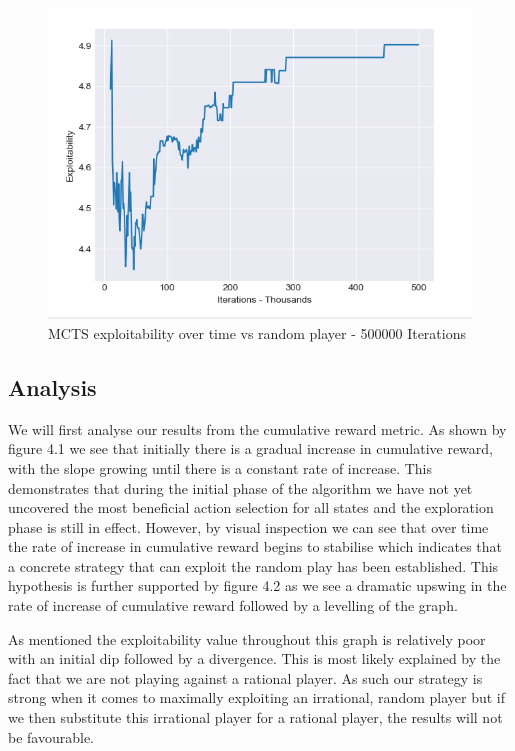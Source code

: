 \begin{figure}[ht]
    \includegraphics[scale=.7]{images/exploitability_500000_20_random.png}
    \caption{MCTS exploitability over time vs random player - 500000 Iterations}
\end{figure}

\subsection{Analysis}\label{subsec:analysis1}
We will first analyse our results from the cumulative reward metric.
As shown by figure 4.1 we see that initially there is a gradual increase in cumulative reward,
with the slope growing until there is a constant rate of increase.
This demonstrates that during the initial phase of the algorithm we have not yet uncovered
the most beneficial action selection for all states and the exploration phase is still in effect.
However, by visual inspection we can see that over time the rate of increase in cumulative
reward begins to stabilise which indicates that a concrete strategy that can exploit
the random play has been established.
This hypothesis is further supported by figure 4.2 as we see a dramatic upswing
in the rate of increase of cumulative reward followed by a levelling of the graph.

As mentioned the exploitability value throughout this graph is relatively poor with an initial dip followed
by a divergence.
This is most likely explained by the fact that we are not playing against a rational player.
As such our strategy is strong when it comes to maximally exploiting an irrational, random player
but if we then substitute this irrational player for a rational player, the results will not be favourable.

